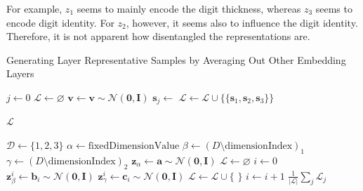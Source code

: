 For example, $z_1$ seems to mainly encode the digit thickness, whereas $z_3$ seems to encode digit identity.
For $z_2$, however, it seems also to influence the digit identity.
Therefore, it is not apparent how disentangled the representations are.
\begin{breakablealgorithm}
    \caption{Generating Layer Representative Samples by Averaging Out Other Embedding Layers}\label{alg:layer_representative_samples}
    \begin{algorithmic}[1]
            \State $j \gets 0$
            \State $\mathcal{L}\gets \varnothing$
                \State $\bm{v} \gets \bm{v} \sim \mathcal{N}(\bm{0}, \bm{I})$\label{line:fixing_v}
                    \State $\bm{s}_j \gets$ 
        \EndFor
        \State $\mathcal{L} \gets \mathcal{L} \cup \{\{\bm{s}_1, \bm{s}_2, \bm{s}_3\}\}$

        \EndWhile
        \State \Return $\mathcal{L}$
        \EndFunction

        \State $\mathcal{D} \gets \{1,2,3\}$
        \State $\alpha \gets \text{fixedDimensionValue}$
        \State $\beta \gets (D \setminus \text{dimensionIndex})_1$
        \State $\gamma \gets (D \setminus \text{dimensionIndex})_2$
        \State $\bm{z}_{\alpha} \gets \bm{a} \sim \mathcal{N}(\bm{0}, \bm{I})$
        \State $\mathcal{L}\gets \varnothing$
        \State $i \gets 0$
        \State $\bm{z}_{\beta}^i \gets \bm{b}_i \sim \mathcal{N}(\bm{0}, \bm{I})$
        \State $\bm{z}_{\gamma}^i \gets \bm{c}_i \sim \mathcal{N}(\bm{0}, \bm{I})$
        \State $\mathcal{L} \gets \mathcal{L} \cup \{$  $\}$
        \State $i \gets i + 1$
        \EndWhile
        \State \Return $\frac{1}{|\mathcal{L}|}\sum_j \mathcal{L}_j$
        \EndFunction
    \end{algorithmic}
\end{breakablealgorithm}

